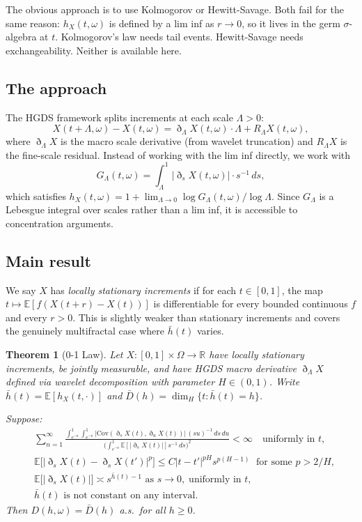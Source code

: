 \documentclass[10pt,a4paper]{amsart}
\newtheorem{theorem}{Theorem}[section]
\newcommand{\E}{\mathbb{E}}
\newcommand{\R}{\mathbb{R}}
\newcommand{\GL}{G_\Lambda}
\newcommand{\hb}{\bar{h}}
\begin{document}
The obvious approach is to use Kolmogorov or Hewitt-Savage. Both fail
for the same reason: $h_X(t,\omega)$ is defined by a lim inf as
$r\to0$, so it lives in the germ $\sigma$-algebra at $t$. Kolmogorov's
law needs tail events. Hewitt-Savage needs exchangeability. Neither is
available here.

\subsection{The approach}

The HGDS framework \cite{hgds1,hgds2,hgds3} splits increments at each
scale $\Lambda>0$:
\[
  X(t+\Lambda,\omega)-X(t,\omega)
  = \eth_\Lambda X(t,\omega)\cdot\Lambda + R_\Lambda X(t,\omega),
\]
where $\eth_\Lambda X$ is the macro scale derivative (from wavelet
truncation) and $R_\Lambda X$ is the fine-scale residual. Instead of
working with the lim inf directly, we work with
\[
  \GL(t,\omega) = \int_\Lambda^1|\eth_s X(t,\omega)|\cdot s^{-1}\,ds,
\]
which satisfies $h_X(t,\omega)=1+\lim_{\Lambda\to0}\log\GL(t,\omega)/
\log\Lambda$. Since $\GL$ is a Lebesgue integral over scales rather
than a lim inf, it is accessible to concentration arguments.

\subsection{Main result}

We say $X$ has \emph{locally stationary increments} if for each
$t\in[0,1]$, the map $t\mapsto\E[f(X(t+r)-X(t))]$ is differentiable
for every bounded continuous $f$ and every $r>0$. This is slightly
weaker than stationary increments and covers the genuinely multifractal
case where $\hb(t)$ varies.


\begin{theorem}[0-1 Law]\label{thm:main}
Let $X:[0,1]\times\Omega\to\R$ have locally stationary increments, be
jointly measurable, and have HGDS macro derivative $\eth_\Lambda X$
defined via wavelet decomposition with parameter $H\in(0,1)$. Write
$\hb(t)=\E[h_X(t,\cdot)]$ and $\bar D(h)=\dim_H\{t:\hb(t)=h\}$.

Suppose:
\begin{align}
  &\sum_{n=1}^\infty
  \frac{\int_{e^{-n}}^1\!\int_{e^{-n}}^1
    |\mathrm{Cov}(\eth_s X(t),\eth_u X(t))|\,(su)^{-1}\,ds\,du}
  {\bigl(\int_{e^{-n}}^1\E[|\eth_s X(t)|]s^{-1}\,ds\bigr)^2}
  <\infty\quad\text{uniformly in }t,\tag{C-i}\\
  &\E\bigl[|\eth_s X(t)-\eth_s X(t')|^p\bigr]
  \le C|t-t'|^{pH}s^{p(H-1)}
  \;\text{ for some }p>2/H,\tag{C-ii}\\
  &\E\bigl[|\eth_s X(t)|\bigr]\asymp s^{\hb(t)-1}
  \text{ as }s\to0,\;\text{uniformly in }t,\tag{C-iii}\\
  &\hb(t)\text{ is not constant on any interval.}\tag{C-iv}
\end{align}
Then $D(h,\omega)=\bar D(h)$ a.s.\ for all $h\ge0$.
\end{theorem}
\end{document}
